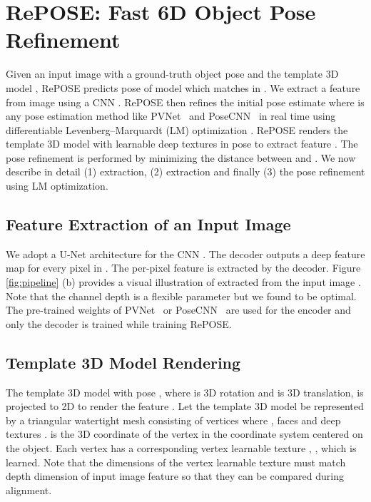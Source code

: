 \documentclass[10pt,twocolumn,letterpaper]{article}
\begin{document}
\section{RePOSE: Fast 6D Object Pose Refinement}
\label{sec:method}
Given an input image  with a ground-truth object pose  and the template 3D model , RePOSE predicts pose  of model  which matches  in . We extract a feature  from image  using a CNN  \ie . RePOSE then refines the initial pose estimate  where  is any pose estimation method like PVNet~\cite{peng2019pvnet} and PoseCNN~\cite{xiang2018posecnn} in real time using differentiable Levenberg–Marquardt (LM) optimization \cite{10.1007/BFb0067700}. RePOSE renders the template 3D model with learnable deep textures in pose  to extract feature . The pose refinement is performed by minimizing the distance between  and . We now describe in detail (1)  extraction, (2)  extraction and finally (3) the pose refinement using LM optimization.

\subsection{Feature Extraction of an Input Image } 
\label{sec:deep_feet_ext}

We adopt a U-Net \cite{RFB15a} architecture for the CNN . The decoder outputs a deep feature map for every pixel in . The per-pixel feature  is extracted by the decoder. Figure \ref{fig:pipeline} (b) provides a visual illustration of  extracted from the input image . Note that the channel depth  is a flexible parameter but we found  to be optimal. The pre-trained weights of PVNet~\cite{peng2019pvnet} or PoseCNN~\cite{xiang2018posecnn} are used for the encoder and only the decoder is trained while training RePOSE. 

\subsection{Template 3D Model Rendering }
\label{sec:deep_feet_rend}

The template 3D model  with pose ,   where  is 3D rotation and  is 3D translation, is projected to 2D to render the feature . Let the template 3D model  be represented by a triangular watertight mesh consisting of  vertices  where , faces  and deep textures .  is the 3D coordinate of the vertex in the coordinate system centered on the object. Each vertex  has a corresponding vertex learnable texture , , which is learned. Note that the dimensions of the vertex learnable texture  must match depth dimension of input image feature  so that they can be compared during alignment.
\end{document}
